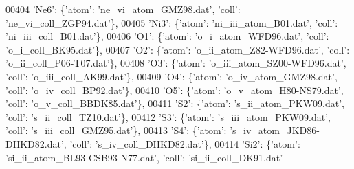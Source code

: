 \begin{DoxyCode}
00404                              \textcolor{stringliteral}{'Ne6'}: \{\textcolor{stringliteral}{'atom'}: \textcolor{stringliteral}{'ne\_vi\_atom\_GMZ98.dat'}, \textcolor{stringliteral}{'coll'}: \textcolor{stringliteral}{'ne\_vi\_coll\_ZGP94.dat'}\},
00405                              \textcolor{stringliteral}{'Ni3'}: \{\textcolor{stringliteral}{'atom'}: \textcolor{stringliteral}{'ni\_iii\_atom\_B01.dat'}, \textcolor{stringliteral}{'coll'}: \textcolor{stringliteral}{'ni\_iii\_coll\_B01.dat'}\},
00406                              \textcolor{stringliteral}{'O1'}: \{\textcolor{stringliteral}{'atom'}: \textcolor{stringliteral}{'o\_i\_atom\_WFD96.dat'}, \textcolor{stringliteral}{'coll'}: \textcolor{stringliteral}{'o\_i\_coll\_BK95.dat'}\},
00407                              \textcolor{stringliteral}{'O2'}: \{\textcolor{stringliteral}{'atom'}: \textcolor{stringliteral}{'o\_ii\_atom\_Z82-WFD96.dat'}, \textcolor{stringliteral}{'coll'}: \textcolor{stringliteral}{'o\_ii\_coll\_P06-T07.dat'}\},
00408                              \textcolor{stringliteral}{'O3'}: \{\textcolor{stringliteral}{'atom'}: \textcolor{stringliteral}{'o\_iii\_atom\_SZ00-WFD96.dat'}, \textcolor{stringliteral}{'coll'}: \textcolor{stringliteral}{'o\_iii\_coll\_AK99.dat'}\},
00409                              \textcolor{stringliteral}{'O4'}: \{\textcolor{stringliteral}{'atom'}: \textcolor{stringliteral}{'o\_iv\_atom\_GMZ98.dat'}, \textcolor{stringliteral}{'coll'}: \textcolor{stringliteral}{'o\_iv\_coll\_BP92.dat'}\},
00410                              \textcolor{stringliteral}{'O5'}: \{\textcolor{stringliteral}{'atom'}: \textcolor{stringliteral}{'o\_v\_atom\_H80-NS79.dat'}, \textcolor{stringliteral}{'coll'}: \textcolor{stringliteral}{'o\_v\_coll\_BBDK85.dat'}\},
00411                              \textcolor{stringliteral}{'S2'}: \{\textcolor{stringliteral}{'atom'}: \textcolor{stringliteral}{'s\_ii\_atom\_PKW09.dat'}, \textcolor{stringliteral}{'coll'}: \textcolor{stringliteral}{'s\_ii\_coll\_TZ10.dat'}\},
00412                              \textcolor{stringliteral}{'S3'}: \{\textcolor{stringliteral}{'atom'}: \textcolor{stringliteral}{'s\_iii\_atom\_PKW09.dat'}, \textcolor{stringliteral}{'coll'}: \textcolor{stringliteral}{'s\_iii\_coll\_GMZ95.dat'}\},
00413                              \textcolor{stringliteral}{'S4'}: \{\textcolor{stringliteral}{'atom'}: \textcolor{stringliteral}{'s\_iv\_atom\_JKD86-DHKD82.dat'}, \textcolor{stringliteral}{'coll'}: \textcolor{stringliteral}{'s\_iv\_coll\_DHKD82.dat'}\},
00414                              \textcolor{stringliteral}{'Si2'}: \{\textcolor{stringliteral}{'atom'}: \textcolor{stringliteral}{'si\_ii\_atom\_BL93-CSB93-N77.dat'}, \textcolor{stringliteral}{'coll'}: \textcolor{stringliteral}{'si\_ii\_coll\_DK91.dat'}

\end{DoxyCode}
